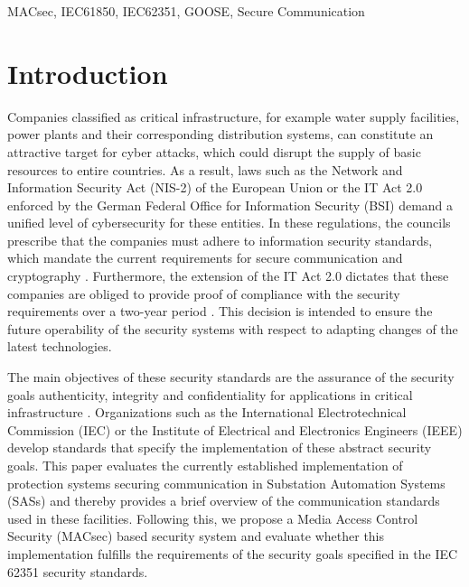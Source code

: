 \documentclass[conference, onecolumn, a4paper]{IEEEtran}
\begin{document}
\vspace{6 pt}

\begin{IEEEkeywords}
    MACsec, IEC61850, IEC62351, GOOSE, Secure Communication
\end{IEEEkeywords}

\section{Introduction}
\label{chapter:introduction}
\noindent Companies classified as critical infrastructure, for example water supply facilities, power plants and their corresponding distribution systems, 
can constitute an attractive target for cyber attacks, which could disrupt the supply of basic resources to entire countries. As a result, laws such as 
the Network and Information Security Act (NIS-2) \cite{NIS-2:2022} of the European Union or the IT Act 2.0 \cite{IT-Gesetz_2:2021} enforced by the German 
Federal Office for Information Security (BSI) demand a unified level of cybersecurity for these entities. In these regulations, the councils prescribe 
that the companies must adhere to information security standards, which mandate the current requirements for secure communication and cryptography 
\cite[p. 9]{BSI-ISMS:2017}. Furthermore, the extension of the IT Act 2.0 dictates that these companies are obliged to provide proof of compliance with 
the security requirements over a two-year period \cite[§11 (1e)]{IT-Gesetz_2:2021}. This decision is intended to ensure the future operability of the 
security systems with respect to adapting changes of the latest technologies. 

\smallskip
The main objectives of these security standards are the assurance of the security goals authenticity, integrity and confidentiality for applications in 
critical infrastructure \cite[§2 (13)]{IT-Gesetz_2:2021}. Organizations such as the International Electrotechnical Commission (IEC) or the Institute of 
Electrical and Electronics Engineers (IEEE) develop standards that specify the implementation of these abstract security goals. This paper evaluates the 
currently established implementation of protection systems securing communication in Substation Automation Systems (SASs) and thereby provides a brief 
overview of the communication standards used in these facilities. Following this, we propose a Media Access Control Security (MACsec) based security system 
and evaluate whether this implementation fulfills the requirements of the security goals specified in the IEC 62351 security standards. 
\end{document}
